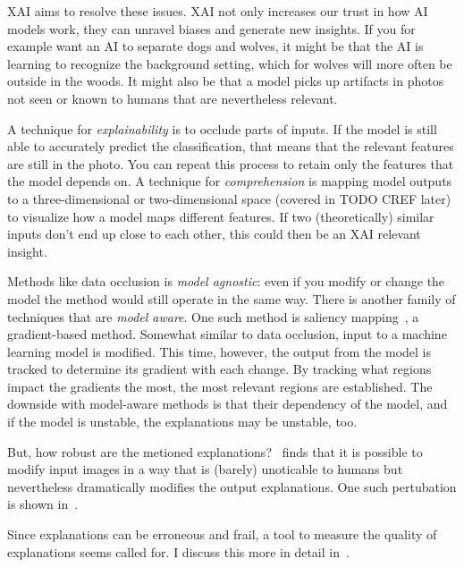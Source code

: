 \documentclass[10pt,twocolumn,letterpaper]{article}
\begin{document}
\gls{XAI} aims to resolve these issues. \gls{XAI} not only increases our trust in how \gls{AI} models work, they can unravel biases and generate new insights. If you for example want an \gls{AI} to separate dogs and wolves, it might be that the \gls{AI} is learning to recognize the background setting, which for wolves will more often be outside in the woods. It might also be that a model picks up artifacts in photos not seen or known to humans that are nevertheless relevant. 

A technique for \textit{explainability} is to occlude parts of inputs. If the model is still able to accurately predict the classification, that means that the relevant features are still in the photo. You can repeat this process to retain only the features that the model depends on. A technique for \textit{comprehension} is mapping model outputs to a three-dimensional or two-dimensional space (covered in TODO CREF later) to visualize how a model maps different features. If two (theoretically) similar inputs don't end up close to each other, this could then be an \gls{XAI} relevant insight.

Methods like data occlusion is \textit{model agnostic}: even if you modify or change the model the method would still operate in the same way. There is another family of techniques that are \textit{model aware}. One such method is saliency mapping~\cite{simonyan2014deep}, a gradient-based method. Somewhat similar to data occlusion, input to a machine learning model is modified. This time, however, the output from the model is tracked to determine its gradient with each change. By tracking what regions impact the gradients the most, the most relevant regions are established. The downside with model-aware methods is that their dependency of the model, and if the model is unstable, the explanations may be unstable, too.

But, how robust are the metioned explanations?~\cite{geometryToBlame} finds that it is possible to modify input images in a way that is (barely) unoticable to humans but nevertheless dramatically modifies the output explanations. One such pertubation is shown in~.

Since explanations can be erroneous and frail, a tool to measure the quality of explanations seems called for. I discuss this more in detail in~.
\end{document}
